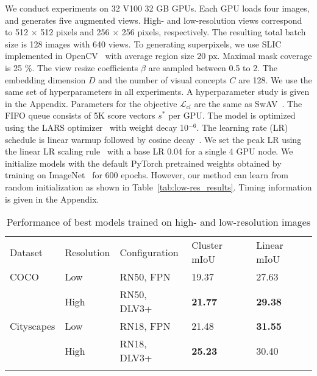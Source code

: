 \documentclass{bmvc2k}
\begin{document}
We conduct experiments on 32 V100 32 GB GPUs. Each GPU loads four images, and generates five augmented views. High- and low-resolution views correspond to 512 $\times$ 512 pixels and 256 $\times$ 256 pixels, respectively. The resulting total batch size is 128 images with 640 views. To generating superpixels, we use SLIC~\cite{Achanta2010SLICSuperpixels} implemented in OpenCV~\cite{Bradski2000OpenCV} with average region size 20 px. Maximal mask coverage is 25 \%. The view resize coefficients $\beta$ are sampled between 0.5 to 2. The embedding dimension $D$ and the number of visual concepts $C$ are 128. We use the same set of hyperparameters in all experiments. A hyperparameter study is given in the Appendix.
Parameters for the objective $\mathcal{L}_{cl}$ are the same as SwAV~\cite{Caron2020SwAV}. The FIFO queue consists of 5K score vectors $s^*$ per GPU. The model is optimized using the LARS optimizer~\cite{You2017LARS} with weight decay 10$^{-6}$. The learning rate (LR) schedule is linear warmup followed by cosine decay~\cite{Loshchilov2017SGDRSG, Misra2020PretextInvRepr}. We set the peak LR using the linear LR scaling rule~\cite{Goyal2017ImageNet1H} with a base LR 0.04 for a single 4 GPU node. We initialize models with the default PyTorch pretrained weights obtained by training on ImageNet~\cite{Deng2009ImageNet} for 600 epochs. However, our method can learn from random initialization as shown in Table~\ref{tab:low-res_results}. Timing information is given in the Appendix.

\setlength{\tabcolsep}{4pt}
\begin{table}
\begin{center}
\caption{Performance of best models trained on high- and low-resolution images}
\begin{tabular}{lllll}
\hline\noalign{\smallskip}
Dataset & Resolution & Configuration & Cluster mIoU & Linear mIoU \\
\noalign{\smallskip}\hline
COCO & Low  & RN50, FPN & 19.37 & 27.63 \\
     & High & RN50, DLV3+ & \textbf{21.77} & \textbf{29.38} \\ \noalign{\smallskip}\hline\noalign{\smallskip}
Cityscapes & Low  & RN18, FPN & 21.48 & \textbf{31.55} \\
           & High & RN18, DLV3+ & \textbf{25.23} & 30.40 \\
\hline
\label{tab:high_low_res}
\end{tabular}
\end{center}
\end{table}
\setlength{\tabcolsep}{1.4pt}
\end{document}
